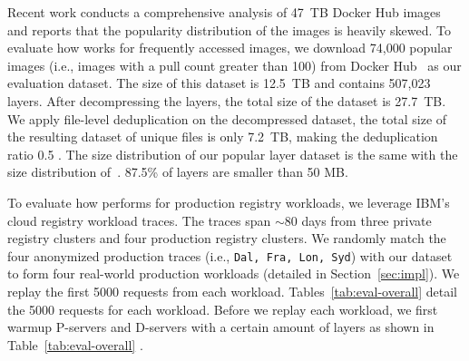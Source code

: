 Recent work \cite{analysisdockergithub} conducts a comprehensive analysis of 47~TB Docker Hub images and reports that the popularity distribution of the images is heavily skewed.
To evaluate how \sysname works for frequently accessed images, 
we download 74,000 popular images (i.e., images with a pull count greater than 100) from Docker Hub~\cite{docker-hub} as our evaluation dataset. 
The size of this dataset is 12.5~TB and contains 507,023 layers. 
After decompressing the layers, the total size of the dataset is 27.7~TB.
We apply file-level deduplication on the decompressed dataset, 
the total size of the resulting dataset of unique files is only 7.2~TB, 
making the deduplication ratio 0.5 .
The size distribution of our popular layer dataset is the same with the size distribution of~\cite{analysisdockergithub}.
87.5\% of layers are smaller than 50 MB.
  
To evaluate how \sysname performs for production registry workloads, 
we leverage IBM's cloud registry workload traces\cite{dockerworkload}. 
The traces span $\sim$80 days from three private registry clusters and 
four production registry clusters. 
We randomly match the four anonymized production traces (i.e., \texttt{Dal, Fra, Lon, Syd}) 
with our dataset to form four real-world production workloads (detailed in Section~\ref{sec:impl}). 
We replay the first 5000 requests from each workload.
Tables~\ref{tab:eval-overall} detail the 5000 requests for each workload.
Before we replay each workload, 
we first warmup P-servers and D-servers with a certain amount of layers 
as shown in Table~\ref{tab:eval-overall} .




%
%